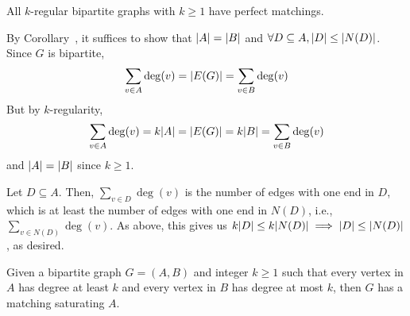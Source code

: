 \begin{theorem}[8.6.2]
  All $k$-regular bipartite graphs with $k \geq 1$ have perfect matchings.
\end{theorem}
\begin{prf}
  By Corollary~, it suffices to show that $\abs{A}=\abs{B}$
  and $\forall D \subseteq A, \abs{D} \leq \abs{N(D)}$.
  Since $G$ is bipartite,
  \[ \sum_{v \in A}\deg(v) = \abs{E(G)} = \sum_{v \in B}\deg(v) \]
  But by $k$-regularity,
  \[ \sum_{v \in A}\deg(v) = k\abs{A} = \abs{E(G)} = k\abs{B} = \sum_{v \in B}\deg(v) \]
  and $\abs{A} = \abs{B}$ since $k \geq 1$.

  Let $D \subseteq A$.
  Then, $\sum_{v \in D} \deg(v)$ is the number of edges with one end in $D$,
  which is at least the number of edges with one end in $N(D)$, i.e.,
  $\sum_{v \in N(D)} \deg(v)$.
  As above, this gives us $k\abs{D} \leq k\abs{N(D)} \implies \abs{D} \leq \abs{N(D)}$, as desired.
\end{prf}

\begin{theorem}
  Given a bipartite graph $G = (A,B)$
  and integer $k \geq 1$ such that every vertex in $A$ has degree at least $k$
  and every vertex in $B$ has degree at most $k$,
  then $G$ has a matching saturating $A$.
\end{theorem}
